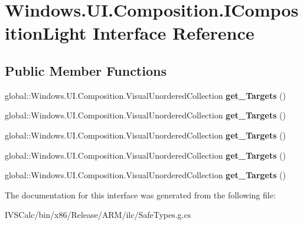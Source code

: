 \hypertarget{interface_windows_1_1_u_i_1_1_composition_1_1_i_composition_light}{}\section{Windows.\+U\+I.\+Composition.\+I\+Composition\+Light Interface Reference}
\label{interface_windows_1_1_u_i_1_1_composition_1_1_i_composition_light}
\subsection*{Public Member Functions}
\begin{DoxyCompactItemize}
\item 
\mbox{\label{interface_windows_1_1_u_i_1_1_composition_1_1_i_composition_light_acb940bcfb6017262e1562e87d78302fd}} 
global\+::\+Windows.\+U\+I.\+Composition.\+Visual\+Unordered\+Collection {\bfseries get\+\_\+\+Targets} ()
\item 
\mbox{\label{interface_windows_1_1_u_i_1_1_composition_1_1_i_composition_light_acb940bcfb6017262e1562e87d78302fd}} 
global\+::\+Windows.\+U\+I.\+Composition.\+Visual\+Unordered\+Collection {\bfseries get\+\_\+\+Targets} ()
\item 
\mbox{\label{interface_windows_1_1_u_i_1_1_composition_1_1_i_composition_light_acb940bcfb6017262e1562e87d78302fd}} 
global\+::\+Windows.\+U\+I.\+Composition.\+Visual\+Unordered\+Collection {\bfseries get\+\_\+\+Targets} ()
\item 
\mbox{\label{interface_windows_1_1_u_i_1_1_composition_1_1_i_composition_light_acb940bcfb6017262e1562e87d78302fd}} 
global\+::\+Windows.\+U\+I.\+Composition.\+Visual\+Unordered\+Collection {\bfseries get\+\_\+\+Targets} ()
\item 
\mbox{\label{interface_windows_1_1_u_i_1_1_composition_1_1_i_composition_light_acb940bcfb6017262e1562e87d78302fd}} 
global\+::\+Windows.\+U\+I.\+Composition.\+Visual\+Unordered\+Collection {\bfseries get\+\_\+\+Targets} ()
\end{DoxyCompactItemize}


The documentation for this interface was generated from the following file\+:\begin{DoxyCompactItemize}
\item 
I\+V\+S\+Calc/bin/x86/\+Release/\+A\+R\+M/ilc/Safe\+Types.\+g.\+cs\end{DoxyCompactItemize}
